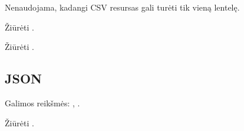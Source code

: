 \documentclass[letterpaper,10pt,lithuanian]{sphinxmanual}
\begin{document}
\begin{fulllineitems}

\pysigstartsignatures
\pysigline
{}
\pysigstopsignatures
\sphinxAtStartPar
Nenaudojama, kadangi CSV resursas gali turėti tik vieną lentelę.

\end{fulllineitems}



\begin{fulllineitems}

\pysigstartsignatures
\pysigline
{}
\pysigstopsignatures
\sphinxAtStartPar
Žiūrėti {\hyperref[\detokenize{formules:stulpeliai-lenteleje}]{}}.

\end{fulllineitems}



\begin{fulllineitems}

\pysigstartsignatures
\pysigline
{}
\pysigstopsignatures
\sphinxAtStartPar
Žiūrėti {\hyperref[\detokenize{formules:stulpeliai-lenteleje}]{}}.

\end{fulllineitems}



\subsection{JSON}
\label{\detokenize{saltiniai:json}}

\begin{fulllineitems}

\pysigstartsignatures
\pysigline
{}
\pysigstopsignatures
\sphinxAtStartPar
Galimos reikšmės: , .

\end{fulllineitems}



\begin{fulllineitems}

\pysigstartsignatures
\pysigline
{}
\pysigstopsignatures
\sphinxAtStartPar
Žiūrėti {\hyperref[\detokenize{formules:failai}]{}}.

\end{fulllineitems}
\end{document}
